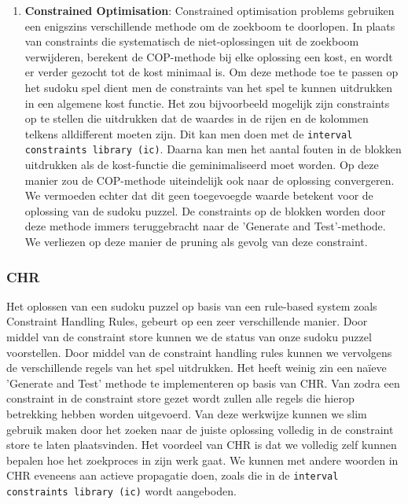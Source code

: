 \begin{enumerate}
\begin{description}
        \end{description}
 \item \textbf{Constrained Optimisation}:
        Constrained optimisation problems gebruiken een enigszins verschillende methode om de zoekboom te doorlopen. In plaats van 
        constraints die systematisch de niet-oplossingen uit de zoekboom verwijderen, berekent de COP-methode bij elke
        oplossing een kost, en wordt er verder gezocht tot de kost minimaal is. Om deze methode toe te passen op het sudoku spel
        dient men de constraints van het spel te kunnen uitdrukken in een algemene kost functie. Het zou bijvoorbeeld mogelijk zijn
        constraints op te stellen die uitdrukken dat de waardes in de rijen en de kolommen telkens alldifferent moeten zijn. Dit
        kan men doen met de \verb|interval constraints library (ic)|. Daarna kan men het aantal fouten in de blokken uitdrukken
        als de kost-functie die geminimaliseerd moet worden. Op deze manier zou de COP-methode uiteindelijk ook naar de oplossing
        convergeren. We vermoeden echter dat dit geen toegevoegde waarde betekent voor de oplossing van de sudoku puzzel. De constraints
        op de blokken worden door deze methode immers teruggebracht naar de 'Generate and Test'-methode. We verliezen op deze manier
        de pruning als gevolg van deze constraint.
 \end{enumerate}

\subsubsection{CHR}
Het oplossen van een sudoku puzzel op basis van een rule-based system zoals Constraint Handling Rules, gebeurt op een zeer 
verschillende manier. Door middel van de constraint store kunnen we de status van onze sudoku puzzel voorstellen. Door middel
van de constraint handling rules kunnen we vervolgens de verschillende regels van het spel uitdrukken. Het heeft weinig zin een na\"ieve
'Generate and Test' methode te implementeren op basis van CHR. Van zodra een constraint in de constraint store gezet wordt
zullen alle regels die hierop betrekking hebben worden uitgevoerd. Van deze werkwijze kunnen we slim gebruik maken door
het zoeken naar de juiste oplossing volledig in de constraint store te laten plaatsvinden. Het voordeel van CHR is dat 
we volledig zelf kunnen bepalen hoe het zoekproces in zijn werk gaat. We kunnen met andere woorden in CHR eveneens 
aan actieve propagatie doen, zoals die in de \verb|interval constraints library (ic)| wordt aangeboden.

